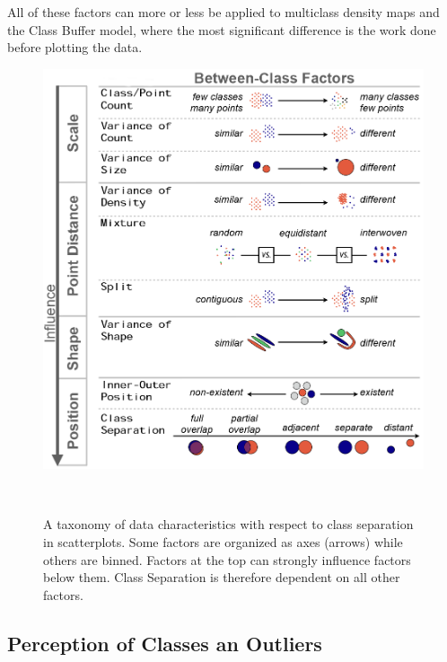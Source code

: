All of these factors can more or less be applied to multiclass density maps and the Class Buffer model, where the most significant difference is the work done before plotting the data.

\begin{figure}
	\centering
	\includegraphics[width=\columnwidth]{./figures/separation}
	\caption[Separation Factors]{A taxonomy of data characteristics with respect to class separation in scatterplots. Some factors are organized as axes (arrows) while others are binned. Factors at the top can strongly influence factors below them. Class Separation is therefore dependent on all other factors.}~\label{fig:separation_factors}
\end{figure}

\subsection{Perception of Classes an Outliers}


